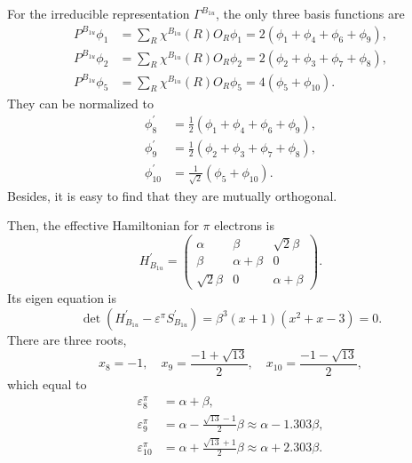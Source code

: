 \documentclass[a4paper]{book}
\newcommand{\Hp}{H^\prime}
\newcommand{\Sp}{S^\prime}
\begin{document}
\begin{solution}
\begin{enumerate}[label=(\alph*)]
		For the irreducible representation $\Gamma^{B_{1u}}$, the only three basis functions are
		\begin{align*}
			P^{B_{1u}}\phi_1 &= \sum_{R} \chi^{B_{1u}}(R) O_R \phi_1 = 2(\phi_1 + \phi_4 + \phi_6 + \phi_9 ), \\
			P^{B_{1u}}\phi_2 &= \sum_{R} \chi^{B_{1u}}(R) O_R \phi_2 = 2(\phi_2 + \phi_3 + \phi_7 + \phi_8 ),  \\
			P^{B_{1u}}\phi_5 &= \sum_{R} \chi^{B_{1u}}(R) O_R \phi_5 = 4(\phi_5 + \phi_{10} ).
		\end{align*}
		They can be normalized to
		\begin{align*}
			\phi^\prime_8 &= \frac{1}{2}(\phi_1 + \phi_4 + \phi_6 + \phi_9), \\
			\phi^\prime_9 &= \frac{1}{2}(\phi_2 + \phi_3 + \phi_7 + \phi_8), \\
			\phi^\prime_{10} &= \frac{1}{\sqrt{2}}(\phi_5 +\phi_{10}).
		\end{align*}
		Besides, it is easy to find that they are mutually orthogonal.
		
		Then, the effective Hamiltonian for $\pi$ electrons is
		\begin{equation*}
			H^\prime_{B_{1u}} = \begin{pmatrix}
				\alpha	&	\beta	&	\sqrt{2}\beta	\\
				\beta	&	\alpha+\beta	&	0		\\
				\sqrt{2}\beta	&	0	&\alpha+\beta
				\end{pmatrix}.				
		\end{equation*}
		Its eigen equation is		
		\begin{equation*}
			\det(\Hp_{B_{1u}}-\varepsilon^\pi \Sp_{B_{1u}}) = \beta^3 (x+1)( x^2 + x - 3 ) = 0.
		\end{equation*}
		There are three roots,
		\begin{equation*}
			x_8 = -1, \quad x_9 = \frac{-1+\sqrt{13}}{2}, \quad x_{10} = \frac{-1-\sqrt{13}}{2},
		\end{equation*}
		which equal to
		\begin{align}
			\varepsilon^\pi_8 &= \alpha + \beta, \\
			\varepsilon^\pi_9 &= \alpha - \frac{\sqrt{13}-1}{2}\beta \approx \alpha - 1.303 \beta, \\
			\varepsilon^\pi_{10} &= \alpha + \frac{\sqrt{13}+1}{2}\beta \approx \alpha + 2.303 \beta.
		\end{align}
		

\end{enumerate}
\end{solution}
\end{document}
